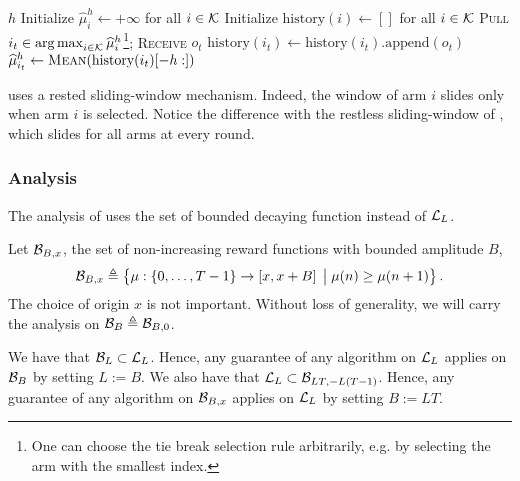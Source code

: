 \begin{minipage}{\textwidth}
\renewcommand*\footnoterule{}
\begin{savenotes}
\begin{algorithm}[H]
\caption{\SWA \citep{levine2017rotting} }
\label{alg:SWA}
\begin{algorithmic}[1]
\Require $h$
\State Initialize $\hat{\mu}_{i}^h \leftarrow + \infty$ for all $i \in \possibleArms$
\State Initialize $\text{history}(i) \leftarrow []$ for all $i \in \possibleArms$
		\State \textsc{Pull}  $i_t \in \argmax_{i \in \possibleArms} \hat{\mu}_{i}^h$\footnote{One can choose the tie break selection rule arbitrarily, e.g. by selecting the arm with the smallest index.}; \textsc{Receive} $o_{t}$
		\State $\text{history}(i_t) \leftarrow \text{history}(i_t)\text{.append}(o_{t})$
		\State $\hat{\mu}_{i_t}^h \leftarrow \textsc{Mean}(\text{history}(i_t)[-h:])$
		\EndIf
	\EndFor
\end{algorithmic}
\end{algorithm}
\end{savenotes}
\end{minipage}
\begin{remark}
\SWA uses a rested sliding-window mechanism. Indeed, the window of arm $i$ slides only when arm $i$ is selected. Notice the difference with the restless sliding-window of \SWUCB \citep{garivier2011upper-confidence-bound}, which slides for all arms at every round.
\end{remark}
%
\subsubsection*{Analysis}

The analysis of \citet{levine2017rotting} uses the set of bounded decaying function instead of $\rewardSet$. 

\begin{definition}\label{def:rew-bounded} 
Let $\BBxSet$, the set of non-increasing reward functions with bounded amplitude $B$,
\[ 
\BBxSet \triangleq \left\{ \mu : \left\{0, \dots, T-1 \right\} \rightarrow \left[x , x +B\right] \;\big{|}\; \mu(n) \geq \mu(n+1)  \right\}.
\]
The choice of origin $x$ is not important. Without loss of generality, we will carry the analysis on $\BBSet \triangleq \BSet_{B,0}$. 
\end{definition}
\begin{remark}
We have that $\BSet_L \subset \rewardSet$. Hence, any guarantee of any algorithm on $\rewardSet$ applies on $\BBSet$ by setting $L := B$. We also have that $\rewardSet \subset \BSet_{LT, -L\pa{T-1}}$. Hence, any guarantee of any algorithm on $\BBxSet$ applies on $\rewardSet$ by setting $B := LT$.
\end{remark}

